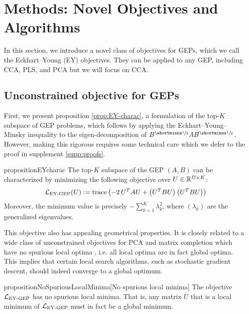 \section{Methods: Novel Objectives and Algorithms}\label{sec:contributions}

In this section, we introduce a novel class of objectives for GEPs, which we call the Eckhart--Young (EY) objectives. They can be applied to any GEP, including CCA, PLS, and PCA but we will focus on CCA.

\subsection{Unconstrained objective for GEPs}\label{sec:gep-ey-formulation}
First, we present proposition \ref{prop:EY-charac}, a formulation of the top-$K$ subspace of GEP problems, which follows by applying the Eckhart--Young--Minsky inequality \citep{stewart_matrix_1990} to the eigen-decomposition of $B^\mhalf A B^\mhalf$. However, making this rigorous requires some technical care which we defer to the proof in supplement \ref{supp:proofs}.

\begin{restatable}{proposition}{EYcharac}
    \label{prop:EY-charac}
    The top-$K$ subspace of the GEP $(A,B)$ can be characterized by minimizing the following objective over $U \in \mathbb{R}^{D \times K}$:
    \begin{align}\label{eq:EY-charac}
    \mathcal{L}_\text{EY-GEP}(U) \vcentcolon= \operatorname{trace} \left( - 2\,U^T A U + \left(U^T B U\right) \left(U^T B U\right) \right)
    \end{align}
    Moreover, the minimum value is precisely $- \sum_{k=1}^K \lambda_k^2$, where $(\lambda_k)$ are the generalized eigenvalues.
\end{restatable}

This objective also has appealing geometrical properties.
It is closely related to a wide class of unconstrained objectives for PCA and matrix completion which have no spurious local optima \citep{ge_no_2017}, i.e. all local optima are in fact global optima.
This implies that certain local search algorithms, such as stochastic gradient descent, should indeed converge to a global optimum.

\begin{restatable}{proposition}{NoSpuriousLocalMinima}[No spurious local minima]\label{prop:no-spurious}
The objective $\mathcal{L}_\text{EY-GEP}$ has no spurious local minima.
That is, any matrix $\bar{U}$ that is a local minimum of $\mathcal{L}_\text{EY-GEP}$ must in fact be a global minimum.
\end{restatable}

